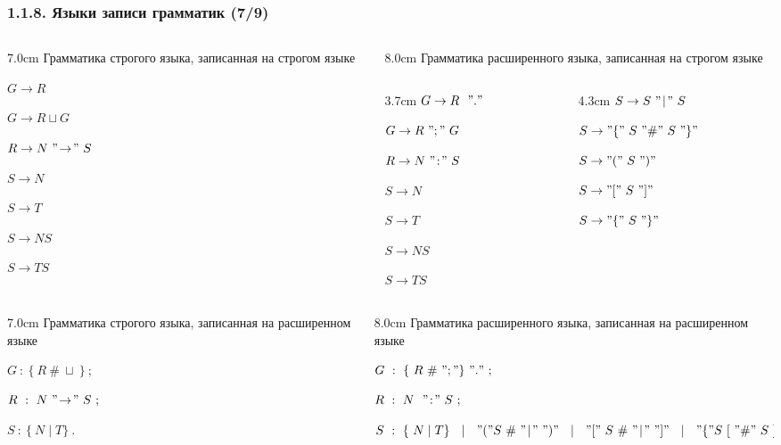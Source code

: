 \begin{frame}
\frametitle{1.1.8. Языки записи грамматик (7/9)}
\begin{columns}[t]
\begin{column}{7.0cm}
Грамматика строгого языка, записанная на строгом языке

$G \rightarrow R$

$G \rightarrow R\sqcup G$

$R \rightarrow N\ "\!\rightarrow\!"\ S$

$S \rightarrow N $

$S \rightarrow T $

$S \rightarrow N S$

$S \rightarrow T S$

\end{column} 
\begin{column}{8.0cm}
Грамматика расширенного языка, записанная на строгом языке

\begin{columns}[t]
\begin{column}{3.7cm}
$G \rightarrow R\ \ "."$

$G \rightarrow R\ ";"\ G$

$R  \rightarrow N\ "\!:\!"\ S$

$S \rightarrow N $

$S \rightarrow T $

$S \rightarrow N S$

$S \rightarrow T S$
\end{column}
\begin{column}{4.3cm}
$S \rightarrow S\  "\!\mid\!"\  S $

$S \rightarrow "\{"\ S\  "\#"\  S\  "\}"$

$S \rightarrow "("\ S\ ")" $

$S \rightarrow "["\ S\ "]" $

$S \rightarrow "\{"\ S\ "\}" $
\end{column}
\end{columns}
\end{column} 
\end{columns}

\medskip
\begin{columns}[t]
\begin{column}{7.0cm}
Грамматика строгого языка, записанная на расширенном языке

$G\ :\ \{\ R\ \#\ \sqcup\ \}\ ; $

$R\ :\ N\ "\!\rightarrow\!"\ S\ ;$

$S\ :\ \{\ N \mid T \}\ . $
\end{column} 
\begin{column}{8.0cm}
Грамматика расширенного языка, записанная на расширенном языке

$G\ :\ \{\ R\ \#\ ";" \}\ "."\ ; $

$R\ :\ N\ \ "\!:\!"\ S\ ;$

$S\ :\ \{\ N \mid T \}\ \ \mid \ \ 
"(" S\ \#\ "\!\mid\!"\ ")" \ \ \mid \ \ \hfill\linebreak 
"["\ S\ \#\ "\!\mid\!"\ "]" \ \ \mid \ \ 
"\{" S \ [\ "\#"\ S\ ]\ "\}" \ 
. $
\end{column} 
\end{columns}
\end{frame}

